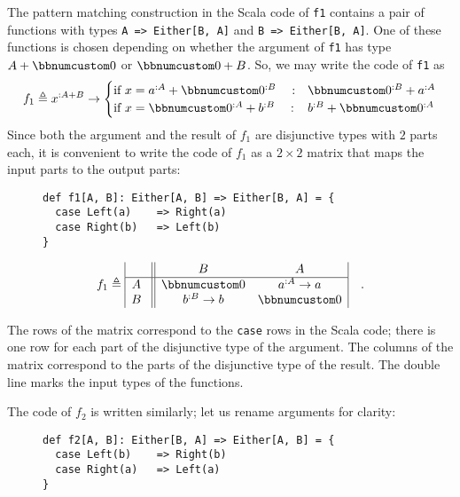 The pattern matching construction in the Scala code of \lstinline!f1!
contains a pair of functions with types \lstinline!A => Either[B, A]!
and \lstinline!B => Either[B, A]!. One of these functions is chosen
depending on whether the argument of \lstinline!f1! has type $A+\bbnum 0$
or $\bbnum 0+B$. So, we may write the code of \lstinline!f1! as
\[
f_{1}\triangleq x^{:A+B}\rightarrow\begin{cases}
\text{if }x=a^{:A}+\bbnum 0^{:B}\quad: & \bbnum 0^{:B}+a^{:A}\\
\text{if }x=\bbnum 0^{:A}+b^{:B}\quad: & b^{:B}+\bbnum 0^{:A}
\end{cases}
\]
Since both the argument and the result of $f_{1}$ are disjunctive
types with $2$ parts each, it is convenient to write the code of
$f_{1}$ as a $2\times2$ matrix that maps the input parts to the
output parts:\begin{wrapfigure}{l}{0.5\columnwidth}%
\vspace{-0.5\baselineskip}
\begin{lstlisting}
def f1[A, B]: Either[A, B] => Either[B, A] = {
  case Left(a)    => Right(a)
  case Right(b)   => Left(b)
}
\end{lstlisting}
\vspace{-2\baselineskip}
\end{wrapfigure}%
\vspace{-0.6\baselineskip}
\[
f_{1}\triangleq\begin{array}{|c||cc|}
 & B & A\\
\hline A~ & \bbnum 0 & a^{:A}\rightarrow a\\
B~ & b^{:B}\rightarrow b & \bbnum 0
\end{array}\quad.
\]
\vspace{-0.5\baselineskip}

The rows of the matrix correspond to the \lstinline!case! rows in
the Scala code; there is one row for each part of the disjunctive
type of the argument. The columns of the matrix correspond to the
parts of the disjunctive type of the result.
The double line marks the input types of the functions.

The code of $f_{2}$ is written similarly; let us rename arguments
for clarity:\hfill{}~\begin{wrapfigure}[4]{l}{0.5\columnwidth}%
\vspace{-0.7\baselineskip}
\begin{lstlisting}
def f2[A, B]: Either[B, A] => Either[A, B] = {
  case Left(b)    => Right(b)
  case Right(a)   => Left(a)
}
\end{lstlisting}
\vspace{-1.5\baselineskip}
\end{wrapfigure}%

